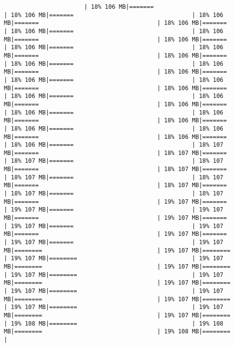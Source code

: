 \documentclass[
]{article}
\begin{document}
\begin{verbatim}
                       | 18% 106 MB|=======                                  | 18% 106 MB|=======                                  | 18% 106 MB|=======                                  | 18% 106 MB|=======                                  | 18% 106 MB|=======                                  | 18% 106 MB|=======                                  | 18% 106 MB|=======                                  | 18% 106 MB|=======                                  | 18% 106 MB|=======                                  | 18% 106 MB|=======                                  | 18% 106 MB|=======                                  | 18% 106 MB|=======                                  | 18% 106 MB|=======                                  | 18% 106 MB|=======                                  | 18% 106 MB|=======                                  | 18% 106 MB|=======                                  | 18% 106 MB|=======                                  | 18% 106 MB|=======                                  | 18% 106 MB|=======                                  | 18% 106 MB|=======                                  | 18% 106 MB|=======                                  | 18% 106 MB|=======                                  | 18% 106 MB|=======                                  | 18% 106 MB|=======                                  | 18% 106 MB|=======                                  | 18% 106 MB|=======                                  | 18% 107 MB|=======                                  | 18% 107 MB|=======                                  | 18% 107 MB|=======                                  | 18% 107 MB|=======                                  | 18% 107 MB|=======                                  | 18% 107 MB|=======                                  | 18% 107 MB|=======                                  | 18% 107 MB|=======                                  | 18% 107 MB|=======                                  | 18% 107 MB|=======                                  | 19% 107 MB|=======                                  | 19% 107 MB|=======                                  | 19% 107 MB|=======                                  | 19% 107 MB|=======                                  | 19% 107 MB|=======                                  | 19% 107 MB|=======                                  | 19% 107 MB|=======                                  | 19% 107 MB|=======                                  | 19% 107 MB|========                                 | 19% 107 MB|========                                 | 19% 107 MB|========                                 | 19% 107 MB|========                                 | 19% 107 MB|========                                 | 19% 107 MB|========                                 | 19% 107 MB|========                                 | 19% 107 MB|========                                 | 19% 107 MB|========                                 | 19% 107 MB|========                                 | 19% 107 MB|========                                 | 19% 107 MB|========                                 | 19% 107 MB|========                                 | 19% 107 MB|========                                 | 19% 108 MB|========                                 | 19% 108 MB|========                                 | 19% 108 MB|========                                 | 
\end{verbatim}
\end{document}
